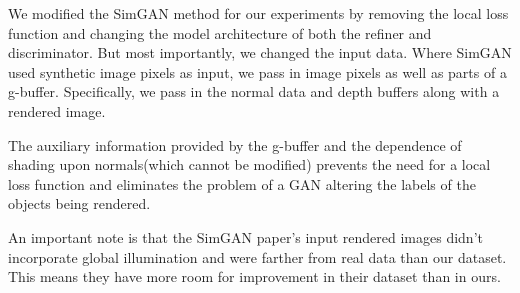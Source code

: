 \documentclass[10pt,twocolumn,letterpaper]{article}
\begin{document}
We modified the SimGAN method for our experiments by removing the local loss function and changing the model architecture of both the refiner and discriminator.  But most importantly, we changed the input data.  Where SimGAN used synthetic image pixels as input, we pass in image pixels as well as parts of a g-buffer. Specifically, we pass in the normal data and depth buffers along with a rendered image.  

The auxiliary information provided by the g-buffer and the dependence of shading upon normals(which cannot be modified) 
prevents the need for a local loss function and eliminates the problem of a GAN altering the labels of the objects being rendered.

An important note is that the SimGAN paper's input rendered images didn't incorporate global illumination and were farther from real data than our dataset. This means they have more room for improvement in their dataset than in ours.  

\end{document}

